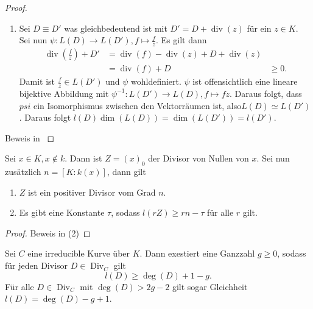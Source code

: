 \begin{proof}
\begin{enumerate}
          $\phi$ ist somit ist eine lineare Abbildung mit $\ker(\phi)=L(D)$. Es kann dann $\overline{\phi}:L(D+P)/L(D)\rightarrow k$ definiert werden.
          \textbf{Später noch fertig machen}
    \item Sei $D\equiv D'$ was gleichbedeutend ist mit $D'=D+\operatorname{div}(z)$ für ein $z\in K$. Sei nun $\psi:L(D)\rightarrow L(D'), f\mapsto \frac{f}{z}$. Es gilt dann
          \begin{align*}
            \operatorname{div}(\frac{f}{z})+D' & =\operatorname{div}(f)-\operatorname{div}(z)+D+\operatorname{div}(z) \\
                                               & = \operatorname{div}(f)+D
                                               & \geq 0.
          \end{align*}
          Damit ist $\frac{f}{z}\in L(D')$ und $\psi$ wohldefiniert. $\psi$ ist offensichtlich eine lineare bijektive Abbildung mit $\psi^{-1}:L(D')\rightarrow L(D), f \mapsto fz$. Daraus folgt, dass $psi$ ein Isomorphismus zwischen den Vektorräumen ist, also$L(D)\simeq L(D')$. Daraus folgt $l(D)\dim(L(D))=\dim(L(D'))=l(D')$.
  \end{enumerate}
  Beweis in \cite[S.99]{Fuelton08}
\end{proof}

\begin{proposition}\label{prop:divisor-tau}
  Sei $x\in K, x\notin k$. Dann ist $Z=(x)_0$ der Divisor von Nullen von $x$. Sei nun zusätzlich $n=[K:k(x)]$, dann gilt
  \begin{enumerate}
    \item $Z$ ist ein positiver Divisor vom Grad $n$.
    \item Es gibt eine Konstante $\tau$, sodass \(l(rZ)\geq rn-\tau\) für alle $r$ gilt.
  \end{enumerate}
\end{proposition}
\begin{proof}
  Beweis in \cite[S.100]{Fuelton08}(2)
\end{proof}

\begin{theorem}
  Sei $C$ eine irreducible Kurve über $K$. Dann exestiert eine Ganzzahl $g\geq 0$, sodass für jeden Divisor $D\in\operatorname{Div}_C$ gilt
  \[
    l(D)\geq\deg(D)+1-g.
  \]
  Für alle $D\in\operatorname{Div}_C$ mit $\deg(D)>2g-2$ gilt sogar Gleichheit $l(D)=\deg(D)-g+1$.
\end{theorem}
\cite[S.66]{Cohen06}
\cite[S.68]{Cohen06}
\cite[S.160]{Hulek12}

